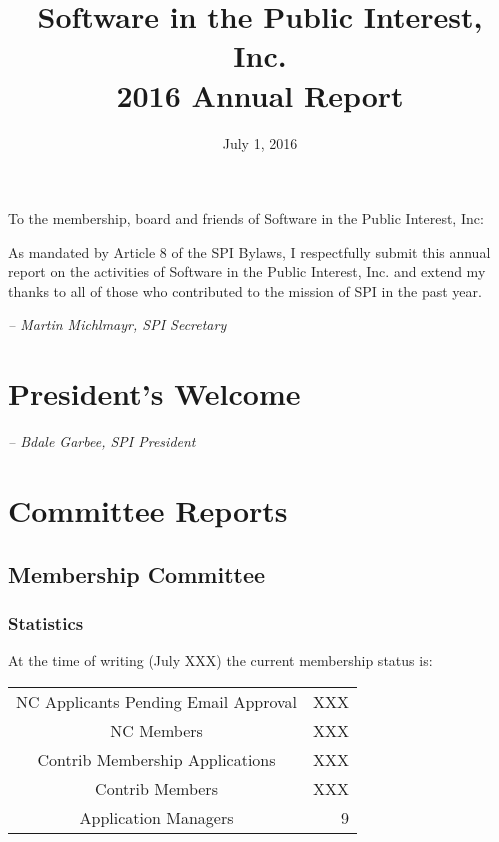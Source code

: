 \documentclass[letterpaper]{report}
\begin{document}
\title{Software in the Public Interest, Inc.\\
2016 Annual Report}
\date{July 1, 2016}

\maketitle

To the membership, board and friends of Software in the Public Interest, Inc:

As mandated by Article 8 of the SPI Bylaws, I respectfully submit this annual
report on the activities of Software in the Public Interest, Inc. and extend my
thanks to all of those who contributed to the mission of SPI in the past year.

  \emph{-- Martin Michlmayr, SPI Secretary}

\newpage

\tableofcontents

\newpage

\chapter{President's Welcome}
\label{sec:president}

  \emph{-- Bdale Garbee, SPI President}

\chapter{Committee Reports}
\section{Membership Committee}

\subsection{Statistics}

At the time of writing (July XXX) the current membership status is:

\begin{tabular}{ | c | r | }
\hline
NC Applicants Pending Email Approval	& XXX\\
NC Members				& XXX\\
Contrib Membership Applications		& XXX\\
Contrib Members				& XXX\\
Application Managers			& 9\\
\hline
\end{tabular}
\end{document}
